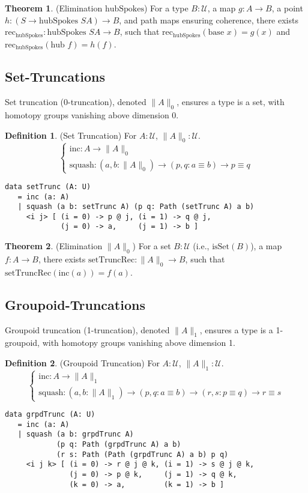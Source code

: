 \documentclass{article}
\theoremstyle{definition}
\newtheorem{theorem}{Theorem}
\newtheorem{definition}{Definition}
\begin{document}
\begin{theorem} (Elimination $\text{hubSpokes}$)
For a type $B : \mathcal{U}$, a map $g : A \to B$,
a point $h : (S \to \text{hubSpokes } S A) \to B$,
and path maps ensuring coherence, there exists
$\text{rec}_{\text{hubSpokes}} : \text{hubSpokes } S A \to B$,
such that $\text{rec}_{\text{hubSpokes}}(\text{base } x) = g(x)$
and $\text{rec}_{\text{hubSpokes}}(\text{hub } f) = h(f)$.
\end{theorem}

\newpage
\subsection{Set-Truncations}
Set truncation (0-truncation), denoted $\| A \|_0$,
ensures a type is a set, with homotopy groups vanishing above dimension 0.

\begin{definition} (Set Truncation)
For $A : \mathcal{U}$, $\| A \|_0 : \mathcal{U}$.
\[
\begin{cases}
\text{inc} : A \to \| A \|_0 \\
\text{squash} : (a, b : \| A \|_0) \to (p, q : a \equiv  b) \to p \equiv q
\end{cases}
\]
\begin{lstlisting}
data setTrunc (A: U)
   = inc (a: A)
   | squash (a b: setTrunc A) (p q: Path (setTrunc A) a b)
     <i j> [ (i = 0) -> p @ j, (i = 1) -> q @ j,
             (j = 0) -> a,     (j = 1) -> b ]
\end{lstlisting}
\end{definition}

\begin{theorem} (Elimination $\| A \|_0$)
For a set $B : \mathcal{U}$ (i.e., $\text{isSet}(B)$), a map $f : A \to B$,
there exists $\text{setTruncRec} : \| A \|_0 \to B$, such that $\text{setTruncRec}(\text{inc}(a)) = f(a)$.
\end{theorem}

\subsection{Groupoid-Truncations}
Groupoid truncation (1-truncation), denoted $\| A \|_1$, ensures a
type is a 1-groupoid, with homotopy groups vanishing above dimension 1.

\begin{definition} (Groupoid Truncation)
For $A : \mathcal{U}$, $\| A \|_1 : \mathcal{U}$.
\[
\begin{cases}
\text{inc} : A \to \| A \|_1 \\
\text{squash} : (a, b : \| A \|_1) \to (p, q : a \equiv b) \to (r, s : p \equiv  q) \to r \equiv s
\end{cases}
\]
\begin{lstlisting}
data grpdTrunc (A: U)
   = inc (a: A)
   | squash (a b: grpdTrunc A)
            (p q: Path (grpdTrunc A) a b)
            (r s: Path (Path (grpdTrunc A) a b) p q)
     <i j k> [ (i = 0) -> r @ j @ k, (i = 1) -> s @ j @ k,
               (j = 0) -> p @ k,     (j = 1) -> q @ k,
               (k = 0) -> a,         (k = 1) -> b ]
\end{lstlisting}
\end{definition}
\end{document}
